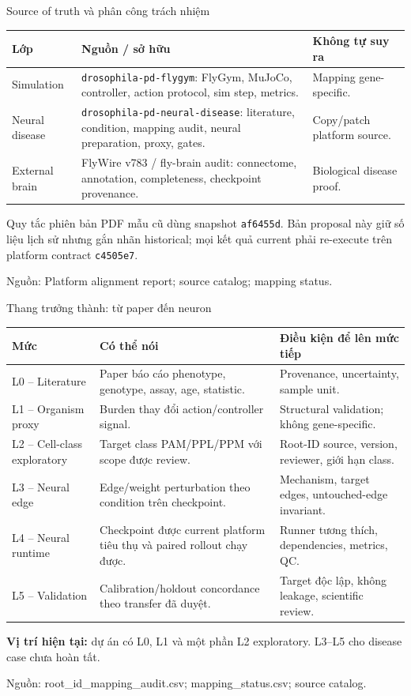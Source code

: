 \documentclass[10pt,aspectratio=169]{beamer}
\newcommand{\hi}[1]{\textcolor{greenteal}{\textbf{#1}}}
\newcommand{\source}[1]{\par\vfill{\fontsize{6.0}{7}\selectfont\color{gray}Nguồn: #1\par}}
\newcommand{\smallgap}{\vspace{0.18cm}}
\begin{document}
\begin{frame}{Source of truth và phân công trách nhiệm}
\renewcommand{\arraystretch}{1.32}
\begin{tabular}{@{}L{2.5cm}L{8.0cm}L{4.0cm}@{}}
\toprule
\textbf{Lớp} & \textbf{Nguồn / sở hữu} & \textbf{Không tự suy ra}\\\midrule
Simulation & \texttt{drosophila-pd-flygym}: FlyGym, MuJoCo, controller, action protocol, sim step, metrics. & Mapping gene-specific.\\
Neural disease & \texttt{drosophila-pd-neural-disease}: literature, condition, mapping audit, neural preparation, proxy, gates. & Copy/patch platform source.\\
External brain & FlyWire v783 / fly-brain audit: connectome, annotation, completeness, checkpoint provenance. & Biological disease proof.\\\bottomrule
\end{tabular}
\smallgap
\begin{block}{Quy tắc phiên bản}
PDF mẫu cũ dùng snapshot \texttt{af6455d}. Bản proposal này giữ số liệu lịch sử nhưng gắn nhãn historical; mọi kết quả current phải re-execute trên platform contract \texttt{c4505e7}.
\end{block}
\source{Platform alignment report; source catalog; mapping status.}
\end{frame}

\begin{frame}{Thang trưởng thành: từ paper đến neuron}
\renewcommand{\arraystretch}{1.22}\scriptsize
\begin{tabular}{@{}L{2.3cm}L{6.2cm}L{6.0cm}@{}}
\toprule
\textbf{Mức} & \textbf{Có thể nói} & \textbf{Điều kiện để lên mức tiếp}\\\midrule
L0 -- Literature & Paper báo cáo phenotype, genotype, assay, age, statistic. & Provenance, uncertainty, sample unit.\\
L1 -- Organism proxy & Burden thay đổi action/controller signal. & Structural validation; không gene-specific.\\
L2 -- Cell-class exploratory & Target class PAM/PPL/PPM với scope được review. & Root-ID source, version, reviewer, giới hạn class.\\
L3 -- Neural edge & Edge/weight perturbation theo condition trên checkpoint. & Mechanism, target edges, untouched-edge invariant.\\
L4 -- Neural runtime & Checkpoint được current platform tiêu thụ và paired rollout chạy được. & Runner tương thích, dependencies, metrics, QC.\\
L5 -- Validation & Calibration/holdout concordance theo transfer đã duyệt. & Target độc lập, không leakage, scientific review.\\\bottomrule
\end{tabular}
\normalsize\smallgap
\hi{Vị trí hiện tại:} dự án có L0, L1 và một phần L2 exploratory. L3--L5 cho disease case chưa hoàn tất.
\source{root\_id\_mapping\_audit.csv; mapping\_status.csv; source catalog.}
\end{frame}
\end{document}
